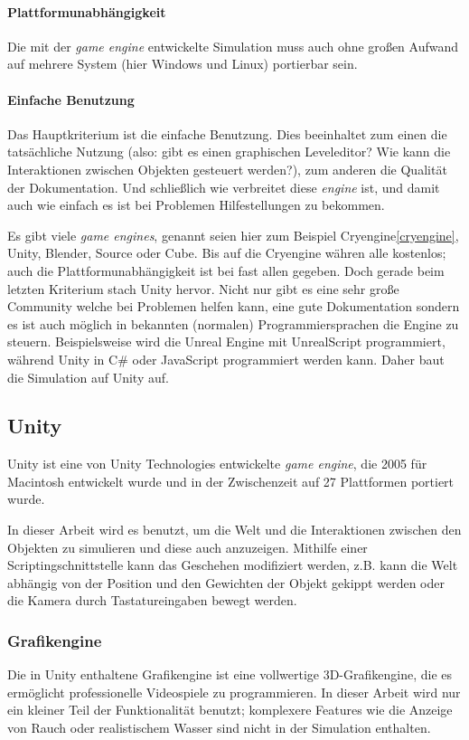 \paragraph{Plattformunabh{\"{a}}ngigkeit} Die mit der \textit{game engine} entwickelte Simulation muss auch
ohne gro{\ss}en Aufwand auf mehrere System (hier Windows und Linux) portierbar sein.

\paragraph{Einfache Benutzung} Das Hauptkriterium ist die einfache Benutzung. Dies beeinhaltet zum einen die
tats{\"{a}}chliche Nutzung (also: gibt es einen graphischen Leveleditor? Wie kann die Interaktionen zwischen
Objekten gesteuert werden?), zum anderen die Qualit{\"{a}}t der Dokumentation. Und schließlich wie verbreitet diese
\textit{engine} ist, und damit auch wie einfach es ist bei Problemen Hilfestellungen zu bekommen.

Es gibt viele \textit{game engines}, genannt seien hier zum Beispiel Cryengine\ref{cryengine}, Unity, Blender, Source
oder Cube. Bis auf die Cryengine w{\"{a}}hren alle kostenlos; auch die Plattformunabh{\"{a}}ngigkeit ist bei
fast allen gegeben. Doch gerade beim letzten Kriterium stach Unity hervor. Nicht nur gibt es eine sehr gro{\ss}e
Community welche bei Problemen helfen kann, eine gute Dokumentation sondern es ist auch m{\"{o}}glich in bekannten
(normalen) Programmiersprachen die Engine zu steuern. Beispielsweise wird die Unreal Engine mit UnrealScript
programmiert, w{\"{a}}hrend Unity in C\# oder JavaScript programmiert werden kann. Daher baut die Simulation auf
Unity auf.

\subsection{Unity}
Unity ist eine von Unity Technologies entwickelte \textit{game engine}, die 2005 f{\"{u}}r Macintosh entwickelt wurde und in der Zwischenzeit auf 27 Plattformen portiert wurde.

In dieser Arbeit wird es benutzt, um die Welt und die Interaktionen zwischen den Objekten zu simulieren und diese auch anzuzeigen. Mithilfe einer Scriptingschnittstelle kann das Geschehen modifiziert werden, z.B. kann die Welt
abh{\"{a}}ngig von der Position und den Gewichten der Objekt gekippt werden oder die Kamera durch Tastatureingaben bewegt werden.

\subsubsection{Grafikengine}
Die in Unity enthaltene Grafikengine ist eine vollwertige 3D-Grafikengine, die es erm{\"{o}}glicht professionelle Videospiele zu programmieren. In dieser Arbeit wird nur
ein kleiner Teil der Funktionalit{\"{a}}t benutzt; komplexere Features wie die Anzeige von Rauch oder realistischem Wasser sind nicht in der Simulation enthalten.

